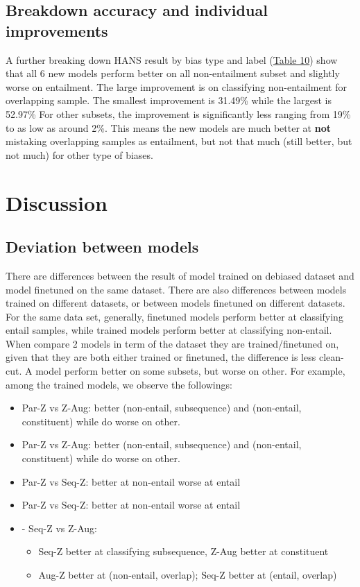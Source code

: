 \documentclass{article}
\begin{document}
\subsection{Breakdown accuracy and individual improvements}

A further breaking down HANS result by bias type and label (\hyperref[table10]{Table 10}) show that all 6 new models perform better on all non-entailment subset and slightly worse on entailment.
The large improvement is on classifying non-entailment for overlapping sample.
The smallest improvement is 31.49\% while the largest is 52.97\%
For other subsets, the improvement is significantly less ranging from 19\% to as low as around 2\%.
This means the new models are much better at \textbf{not} mistaking overlapping samples as entailment, but not that much (still better, but not much) for other type of biases.

\section{Discussion}
\subsection{Deviation between models}
There are differences between the result of model trained on debiased dataset and model finetuned on the same dataset.
There are also differences between models trained on different datasets, or between models finetuned on different datasets.
For the same data set, generally, finetuned models perform better at classifying entail samples, while trained models perform better at classifying non-entail.
When compare 2 models in term of the dataset they are trained/finetuned on, given that they are both either trained or finetuned, the difference is less clean-cut.
A model perform better on some subsets, but worse on other.
For example, among the trained models, we observe the followings:
\begin{itemize}
    \item Par-Z vs Z-Aug: better (non-entail, subsequence) and (non-entail, constituent) while do worse on other.
    \item Par-Z vs Z-Aug: better (non-entail, subsequence) and (non-entail, constituent) while do worse on other.
    \item Par-Z vs Seq-Z: better at non-entail worse at entail
    \item Par-Z vs Seq-Z: better at non-entail worse at entail
    \item - Seq-Z vs Z-Aug:
    \begin{itemize}
        \item Seq-Z better at classifying subsequence, Z-Aug better at constituent
        \item  Aug-Z better at (non-entail, overlap); Seq-Z better at (entail, overlap)
    \end{itemize}
\end{itemize}
\end{document}

